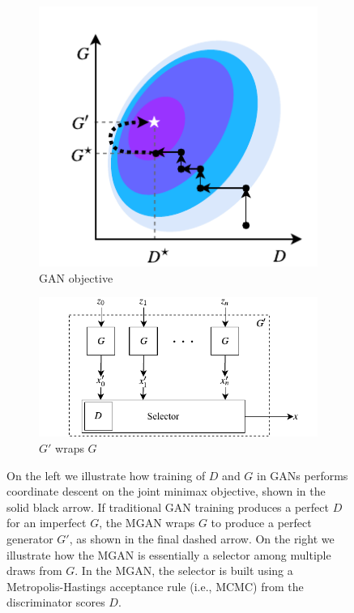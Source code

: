 \documentclass{article}
\begin{document}
\begin{figure}[bhtp]
    \centering
    \begin{subfigure}[t]{2.25in}
       \centering
       \includegraphics[scale=1.0]{figures/coord_descent.pdf}
       \caption{GAN objective}
    \end{subfigure}
    \hfill
    \begin{subfigure}[t]{3in}
       \centering
       \includegraphics[scale=1.0]{figures/block_diag.pdf}
       \caption{$G'$ wraps $G$}
    \end{subfigure}
    \caption{{\small
    On the left we illustrate  how training of $D$ and $G$ in GANs performs coordinate descent on the joint minimax objective, shown in the solid black arrow.
    If traditional GAN training produces a perfect $D$ for an imperfect $G$, the MGAN wraps $G$ to produce a perfect generator $G'$, as shown in the final dashed arrow.
    On the right we illustrate how the MGAN is essentially a selector among multiple draws from $G$.
    In the MGAN, the selector is built using a Metropolis-Hastings acceptance rule (i.e., MCMC) from the discriminator scores $D$.
    }}
    \label{fig:block_diag}
\end{figure}
\end{document}
